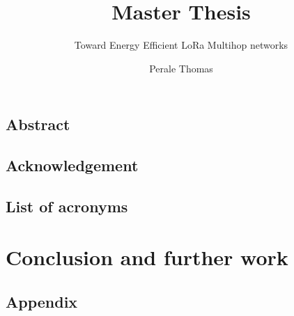 \documentclass[11pt]{report}
\title{Master Thesis}
\subtitle{Toward Energy Efficient LoRa Multihop networks}
\author{Perale Thomas}
\begin{document}
\maketitle


\section*{Abstract}

\newpage

\section*{Acknowledgement}

\newpage

\tableofcontents

\newpage

\listoffigures

\newpage

\section*{List of acronyms}



\newpage










\chapter{Conclusion and further work}

\newpage

\printbibliography

\newpage

\section{Appendix}
\end{document}
